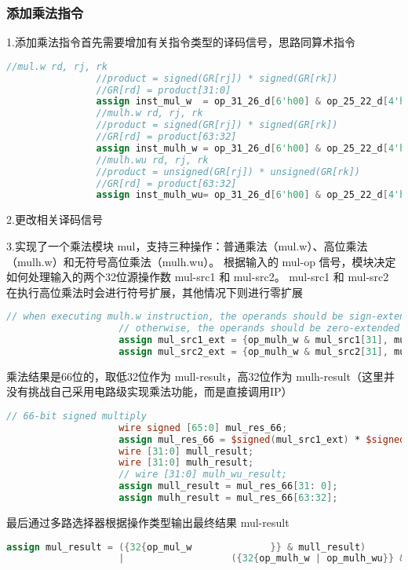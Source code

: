 \documentclass[12pt,a4paper]{article}
\begin{document}
        \subsubsection{添加乘法指令}
            1.添加乘法指令首先需要增加有关指令类型的译码信号，思路同算术指令
            \begin{lstlisting}[language=Verilog]
                //mul.w rd, rj, rk
                //product = signed(GR[rj]) * signed(GR[rk])
                //GR[rd] = product[31:0]
                assign inst_mul_w  = op_31_26_d[6'h00] & op_25_22_d[4'h0] & op_21_20_d[2'h1] & op_19_15_d[5'h18];
                //mulh.w rd, rj, rk
                //product = signed(GR[rj]) * signed(GR[rk])
                //GR[rd] = product[63:32]
                assign inst_mulh_w = op_31_26_d[6'h00] & op_25_22_d[4'h0] & op_21_20_d[2'h1] & op_19_15_d[5'h19];
                //mulh.wu rd, rj, rk
                //product = unsigned(GR[rj]) * unsigned(GR[rk])
                //GR[rd] = product[63:32]
                assign inst_mulh_wu= op_31_26_d[6'h00] & op_25_22_d[4'h0] & op_21_20_d[2'h1] & op_19_15_d[5'h1a];
            \end{lstlisting}
            \par
            2.更改相关译码信号
            \par
            3.实现了一个乘法模块 mul，支持三种操作：普通乘法（mul.w）、高位乘法（mulh.w）和无符号高位乘法（mulh.wu）。
            根据输入的 mul-op 信号，模块决定如何处理输入的两个32位源操作数 mul-src1 和 mul-src2。           
            mul-src1 和 mul-src2 在执行高位乘法时会进行符号扩展，其他情况下则进行零扩展
                \begin{lstlisting}[language=Verilog]
                    // when executing mulh.w instruction, the operands should be sign-extended;
                    // otherwise, the operands should be zero-extended
                    assign mul_src1_ext = {op_mulh_w & mul_src1[31], mul_src1};
                    assign mul_src2_ext = {op_mulh_w & mul_src2[31], mul_src2};
                \end{lstlisting}
            乘法结果是66位的，取低32位作为 mull-result，高32位作为 mulh-result（这里并没有挑战自己采用电路级实现乘法功能，而是直接调用IP）
                \begin{lstlisting}[language=Verilog]
                    // 66-bit signed multiply
                    wire signed [65:0] mul_res_66;
                    assign mul_res_66 = $signed(mul_src1_ext) * $signed(mul_src2_ext);
                    wire [31:0] mull_result;
                    wire [31:0] mulh_result;
                    // wire [31:0] mulh_wu_result;
                    assign mull_result = mul_res_66[31: 0];
                    assign mulh_result = mul_res_66[63:32];
                \end{lstlisting}
            最后通过多路选择器根据操作类型输出最终结果 mul-result
                \begin{lstlisting}[language=Verilog]
                    assign mul_result = ({32{op_mul_w              }} & mull_result)
                    |                   ({32{op_mulh_w | op_mulh_wu}} & mulh_result);
                \end{lstlisting}
\end{document}
